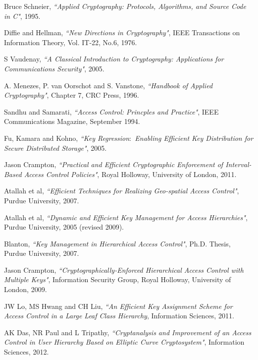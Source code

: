 \documentclass[12pt, titlepage]{article}
\begin{document}
\begin{thebibliography}{10}

Bruce Schneier, \emph{``Applied Cryptography: Protocols, Algorithms, and Source Code in C"}, 1995.

Diffie and Hellman, \emph{``New Directions in Cryptography"},
IEEE Transactions on Information Theory, Vol. IT-22, No.6, 1976.

S Vaudenay, \emph{``A Classical Introduction to Cryptography: Applications for Communications Security"}, 2005.

A. Menezes, P. van Oorschot and S. Vanstone, \emph{``Handbook of Applied Cryptography"}, Chapter 7, CRC Press, 1996.

Sandhu and Samarati, \emph{``Access Control: Princples and Practice"},
IEEE Communications Magazine, September 1994.

Fu, Kamara and Kohno, \emph{``Key Regression$\colon$ Enabling Efficient Key Distribution for Secure Distributed Storage"}, 2005.

Jason Crampton, \emph{``Practical and Efficient Cryptographic Enforcement of Interval-Based
Access Control Policies"}, Royal Holloway, University of London, 2011.

Atallah et al, \emph{``Efficient Techniques for Realizing Geo-spatial Access Control"},  Purdue University, 2007.

Atallah et al, \emph{``Dynamic and Efficient Key Management for Access Hierarchies"}, Purdue University, 2005 (revised 2009).

Blanton, \emph{``Key Management in Hierarchical Access Control"}, Ph.D. Thesis, Purdue University, 2007.

Jason Crampton, \emph{``Cryptographically-Enforced Hierarchical
Access Control with Multiple Keys"}, Information Security Group, Royal Holloway, University of London, 2009.

JW Lo, MS Hwang and CH Liu, \emph{``An Efficient Key Assignment Scheme for Access Control in a Large Leaf Class Hierarchy}, Information Sciences, 2011.

AK Das, NR Paul and L Tripathy, \emph{``Cryptanalysis and Improvement of an Access Control in User Hierarchy Based on Elliptic Curve Cryptosystem"}, Information Sciences, 2012.


\end{thebibliography}
\end{document}
